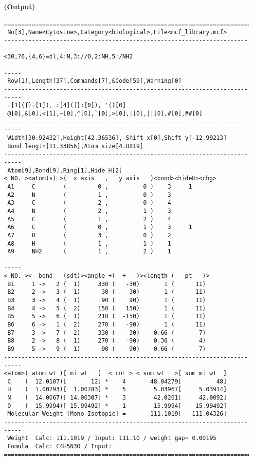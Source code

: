\documentclass[a4paper]{article}
\begin{document}
\paragraph{(Output)}
\begin{verbatim}
===========================================================================
 No[3],Name<Cytosine>,Category<biological>,File<mcf_library.mcf>
---------------------------------------------------------------------------
<30,?6,{4,6}=dl,4:N,3://O,2:NH,5:/NH2
---------------------------------------------------------------------------
 Row[1],Length[37],Commands[7],&Code[59],Warning[0]
---------------------------------------------------------------------------
 =[1]({}=[1]), :[4]({}:[0]), '()[0]
 @[0],&[0],<[1],~[0],^[0],`[0],>[0],|[0],||[0],#[0],##[0]
---------------------------------------------------------------------------
 Width[30.92432],Height[42.36536], Shift x[0],Shift y[-12.99213]
 Bond length[11.33856],Atom size[4.8819]
---------------------------------------------------------------------------
 Atom[9],Bond[9],Ring[1],Hide H[2]
< NO. ><atom(s) >(  x axis   ,   y axis   )<bond><hideH><chg>
 A1     C        (         0 ,          0 )    3     1
 A2     N        (         1 ,          0 )    3        
 A3     C        (         2 ,          0 )    4        
 A4     N        (         2 ,          1 )    3        
 A5     C        (         1 ,          2 )    4        
 A6     C        (         0 ,          1 )    3     1
 A7     O        (         3 ,          0 )    2        
 A8     H        (         1 ,         -1 )    1        
 A9     NH2      (         1 ,          2 )    1        
---------------------------------------------------------------------------
< NO. ><  bond   (sdt)><angle +(  +-  )><length (   pt   )>
 B1     1 ->   2 (  1)     330 (   -30)       1 (      11)
 B2     2 ->   3 (  1)      30 (    30)       1 (      11)
 B3     3 ->   4 (  1)      90 (    90)       1 (      11)
 B4     4 ->   5 (  2)     150 (   150)       1 (      11)
 B5     5 ->   6 (  1)     210 (  -150)       1 (      11)
 B6     6 ->   1 (  2)     270 (   -90)       1 (      11)
 B7     3 ->   7 (  2)     330 (   -30)    0.66 (       7)
 B8     2 ->   8 (  1)     270 (   -90)    0.36 (       4)
 B9     5 ->   9 (  1)      90 (    90)    0.66 (       7)
---------------------------------------------------------------------------
<atom>( atom wt )[ mi wt   ]  < cnt > < sum wt   >[ sum mi wt  ]
 C    (  12.0107)[       12] *    4       48.04279[          48]
 H    (  1.00793)[  1.00783] *    5        5.03967[     5.03914]
 N    (  14.0067)[ 14.00307] *    3        42.0201[     42.0092]
 O    (  15.9994)[ 15.99492] *    1        15.9994[    15.99492]
 Molecular Weight [Mono Isotopic] =       111.1019[   111.04326]
---------------------------------------------------------------------------
 Weight  Calc: 111.1019 / Input: 111.10 / weight gap= 0.00195
 Fomula  Calc: C4H5N3O / Input: 
===========================================================================
\end{verbatim}
\newpage
\noindent%
\end{document}
